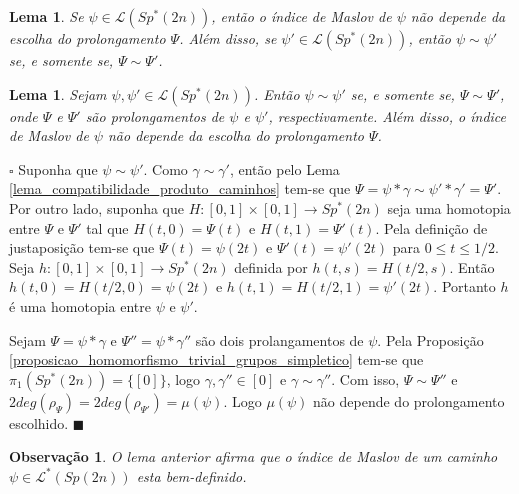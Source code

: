 \documentclass[12pt]{book}
\newtheorem{lema}[teorema]{Lema}
\newtheorem{observacao}[teorema]{Observação}
\newenvironment{prova}[1]{$\square$ #1}{\hfill$\blacksquare$}
\newcommand{\caminhosespeciais}[1]{\mathcal{L}^{*}(#1)}
\newcommand{\caminhos}{\mathcal{L}}
\newcommand{\classe}[1]{[#1]}
\newcommand{\grupofundamental}[1]{\pi_{1}(#1)}
\newcommand{\gruposimpletico}[1]{Sp(#1)}
\newcommand{\gruposimpleticonaodegenerado}[1]{Sp^{#1}(2n)}
\newcommand{\intervalo}{[0,1]}
\begin{document}
	\begin{lema}\label{lema_independencia_prolongamento}
		Se $\psi \in  \caminhos({\gruposimpleticonaodegenerado{*}})$, então o índice de Maslov de $\psi$ não depende da escolha do prolongamento $\Psi$. Além disso, se $\psi' \in \caminhos{(\gruposimpleticonaodegenerado{*})}$, então $\psi \sim \psi'$ se, e somente se, $\Psi \sim \Psi'$.
	\end{lema}
	\begin{lema}\label{lema_independencia_prolongamento}
		Sejam $\psi,\psi' \in  \caminhos({\gruposimpleticonaodegenerado{*}})$. Então $\psi \sim \psi'$ se, e somente se, $\Psi \sim \Psi'$, onde $\Psi$ e $\Psi'$ são prolongamentos de $\psi$ e $\psi'$, respectivamente. Além disso, o índice de Maslov de $\psi$ não depende da escolha do prolongamento $\Psi$.
	\end{lema}
	\begin{prova}
		Suponha que $\psi \sim \psi'$. Como $\gamma \sim \gamma'$, então pelo Lema \ref{lema_compatibilidade_produto_caminhos} tem-se que $\Psi = \psi*\gamma \sim \psi'*\gamma' = \Psi'$. Por outro lado, suponha que $H: \intervalo \times \intervalo \to \gruposimpleticonaodegenerado{*}$ seja uma homotopia entre $\Psi $ e $\Psi'$ tal que $H(t,0) = \Psi(t)$ e $H(t,1) = \Psi'(t)$. Pela definição de justaposição tem-se que $\Psi(t) = \psi(2t)$ e $\Psi'(t) = \psi'(2t)$ para $0 \leq t \leq 1/2$. Seja $h: \intervalo \times \intervalo \to \gruposimpleticonaodegenerado{*}$ definida por $h(t,s) = H(t/2, s)$. Então  $h(t,0) = H(t/2, 0) =  \psi(2t)$ e $h(t,1)=H(t/2,1) = \psi'(2t)$. Portanto $h$ é uma homotopia entre $\psi$ e $\psi'$.
		
		Sejam $\Psi=\psi*\gamma$ e $\Psi''=\psi*\gamma''$ são dois prolangamentos de $\psi$. Pela Proposição \ref{proposicao_homomorfismo_trivial_grupos_simpletico} tem-se que $\grupofundamental{\gruposimpleticonaodegenerado{*}} = \{\classe{0}\}$, logo $\gamma, \gamma''\in \classe{0}$ e $\gamma\sim \gamma''$. Com isso, $\Psi\sim \Psi''$ e $2deg(\rho_{\Psi})=2deg(\rho_{\Psi'})=\mu(\psi)$. Logo $\mu(\psi)$ não depende do prolongamento escolhido.
	\end{prova}
	
	\begin{observacao}
		O lema anterior afirma que o índice de Maslov de um caminho $\psi\in \caminhosespeciais{\gruposimpletico{2n}}$ esta bem-definido.
	\end{observacao}
	
\end{document}

